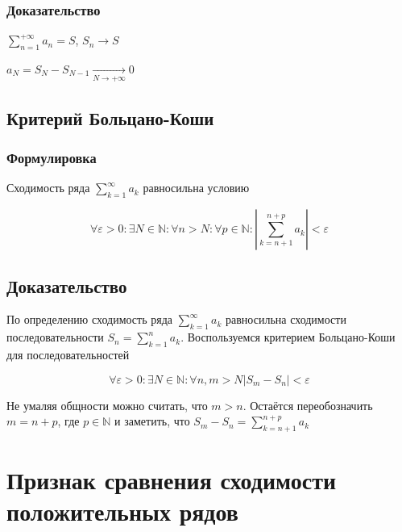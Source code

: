 \documentclass{article}
\begin{document}
            \subsubsection{Доказательство}
            
                $\sum\limits^{+\infty}_{n = 1} a_n = S$, $S_n \rightarrow S$
                
                $a_N = S_N - S_{N - 1} \xrightarrow[N \rightarrow +\infty]{} 0$
                
        \subsection{Критерий Больцано-Коши}
        
            \subsubsection{Формулировка}
            
                Сходимость ряда $\sum\limits^{\infty}_{k = 1} a_k$ равносильна условию
            
                $$\forall \varepsilon > 0 : \exists N \in \mathbb{N} : \forall n > N : \forall p \in \mathbb{N} : \left| \sum\limits^{n + p}_{k = n + 1} a_k \right| < \varepsilon$$
            
            \subsection{Доказательство}
            
                По определению сходимость ряда $\sum\limits^{\infty}_{k = 1} a_k$ равносильна сходимости последовательности $S_n = \sum\limits^n_{k = 1} a_k$. Воспользуемся критерием Больцано-Коши для последовательностей 
                
                $$\forall \varepsilon > 0 : \exists N \in \mathbb{N} : \forall n, m > N |S_m - S_n| < \varepsilon$$
                
                Не умаляя общности можно считать, что $m > n$. Остаётся переобозначить $m = n + p$, где $p \in \mathbb{N}$ и заметить, что $S_m - S_n = \sum\limits^{n+p}_{k = n + 1} a_k$
                
    \newpage
    
    \section{Признак сравнения сходимости положительных рядов}
    
\end{document}
